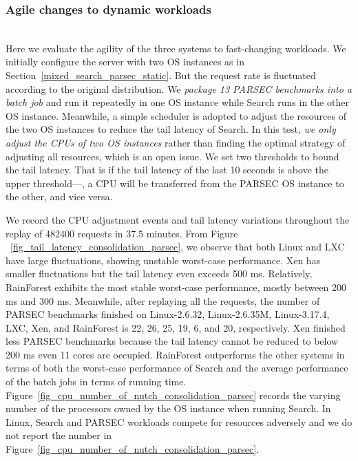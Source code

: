 \documentclass[pageno]{jpaper}
\begin{document}
\subsubsection{Agile changes to dynamic workloads}\label{agility}
\textrm{\\} Here we evaluate the agility of the three systems to fast-changing workloads.
We initially configure the server with two OS instances as in Section~\ref{mixed_search_parsec_static}. But the request rate is fluctuated according to the original distribution. We \emph{package 13 PARSEC benchmarks into a batch job} and run it repeatedly in one OS instance while Search runs in the other OS instance. Meanwhile, a simple scheduler is adopted to adjust the resources of the two OS instances to reduce the tail latency of Search. In this test, \emph{we only adjust the CPUs of two OS instances} rather than finding the optimal strategy of adjusting all resources, which is an open issue. We set two thresholds  to bound the tail latency. That is if the tail latency of the last 10 seconds is above the upper threshold---, a CPU will be transferred from the PARSEC OS instance to the other, and vice versa.


We record the CPU adjustment events and tail latency variations throughout the replay of 482400 requests in 37.5 minutes. From Figure ~\ref{fig_tail_latency_consolidation_parsec}, we observe that both Linux and LXC have large fluctuations, showing unstable worst-case performance. Xen has smaller fluctuations but the tail latency even exceeds 500 ms. Relatively, RainForest exhibits the most stable worst-case performance, mostly between 200 ms and 300 ms. Meanwhile, after replaying all the requests, the number of PARSEC benchmarks finished on Linux-2.6.32, Linux-2.6.35M, Linux-3.17.4, LXC, Xen, and RainForest is  22, 26, 25, 19, 6, and 20,  respectively. Xen finished less PARSEC benchmarks because the tail latency cannot be reduced to below 200 ms even 11 cores are occupied. RainForest outperforms the other systems in terms of both the worst-case performance of Search and the average  performance of the batch jobs in terms of running time.
Figure~\ref{fig_cpu_number_of_nutch_consolidation_parsec}  records the varying number of the processors owned by the OS
instance when running Search. In Linux, Search and PARSEC workloads compete for resources adversely and we do not report the number in Figure~\ref{fig_cpu_number_of_nutch_consolidation_parsec}.
\end{document}

